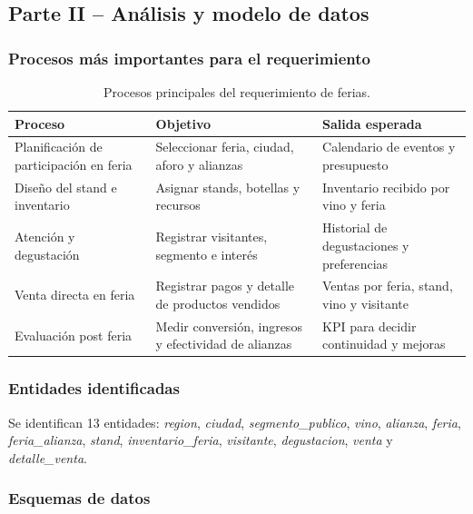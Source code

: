 \documentclass[10pt,a4paper]{article}
\begin{document}
\subsection{Parte II -- An\'alisis y modelo de datos}

\subsubsection{Procesos m\'as importantes para el requerimiento}

\begin{table}[H]
\centering
\caption{Procesos principales del requerimiento de ferias.}
\label{tab:procesos_req}
\small
\begin{tabular}{p{3.5cm} p{4.5cm} p{5.5cm}}
\toprule
\textbf{Proceso} & \textbf{Objetivo} & \textbf{Salida esperada} \\
\midrule
Planificaci\'on de participaci\'on en feria & Seleccionar feria, ciudad, aforo y alianzas & Calendario de eventos y presupuesto \\
Dise\~no del stand e inventario & Asignar stands, botellas y recursos & Inventario recibido por vino y feria \\
Atenci\'on y degustaci\'on & Registrar visitantes, segmento e inter\'es & Historial de degustaciones y preferencias \\
Venta directa en feria & Registrar pagos y detalle de productos vendidos & Ventas por feria, stand, vino y visitante \\
Evaluaci\'on post feria & Medir conversi\'on, ingresos y efectividad de alianzas & KPI para decidir continuidad y mejoras \\
\bottomrule
\end{tabular}
\end{table}

\subsubsection{Entidades identificadas}

Se identifican 13 entidades: \textit{region}, \textit{ciudad}, \textit{segmento\_publico}, \textit{vino}, \textit{alianza}, \textit{feria}, \textit{feria\_alianza}, \textit{stand}, \textit{inventario\_feria}, \textit{visitante}, \textit{degustacion}, \textit{venta} y \textit{detalle\_venta}.

\subsubsection{Esquemas de datos}
\end{document}
